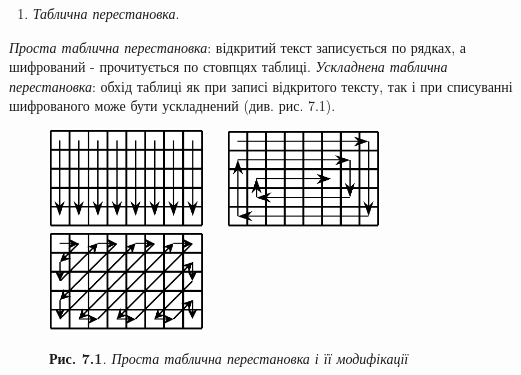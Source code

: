 \documentclass[a4paper]{article}
\newcounter{saveenum}
\newcommand\liststyleWWviiiNumxli{%
\renewcommand\theenumi{\arabic{enumi}}
\renewcommand\theenumii{\alph{enumii}}
\renewcommand\theenumiii{\roman{enumiii}}
\renewcommand\theenumiv{\arabic{enumiv}}
\renewcommand\labelenumi{\theenumi)}
\renewcommand\labelenumii{\theenumii.}
\renewcommand\labelenumiii{\theenumiii.}
\renewcommand\labelenumiv{\theenumiv.}
}
\newcounter{}
\begin{document}
\liststyleWWviiiNumxli
\setcounter{saveenum}{\value{enumi}}
\begin{enumerate}
\setcounter{enumi}{\value{saveenum}}
\item  \textit{Таблична перестановка}. 
\end{enumerate}
\textit{Проста таблична перестановка}: відкритий текст записується по рядках,  а
шифрований - прочитується по стовпцях таблиці. \textit{Ускладнена таблична
перестановка}: обхід таблиці як при записі відкритого тексту, так і при
списуванні шифрованого  може бути ускладнений (див. рис. 7.1).

  

\begin{figure}
\centering
\begin{minipage}{5.8634in}
{\centering\bfseries
 \includegraphics[width=1.6201in,height=1.0209in]{crypt-img/crypt-img64.png}
\ \  
\includegraphics[width=1.6201in,height=1.0102in]{crypt-img/crypt-img65.png} 
\ \ 
\includegraphics[width=1.6201in,height=1.0209in]{crypt-img/crypt-img66.png} 
\par}
\end{minipage}
\end{figure}
\begin{figure}
\centering
\begin{minipage}{5.4543in}
{\centering
\textbf{Рис. 7.1}\textit{. Проста таблична перестановка і її модифікації}
\par}


\bigskip
\end{minipage}
\end{figure}

\bigskip
\end{document}
